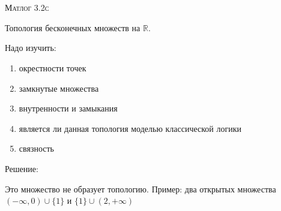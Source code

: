 \documentclass[10pt]{article}
\begin{document}
\def\chap#1#2{\ \\ {\large\bf#1 \ | \ \tt\scshape#2} \par}

\ \vspace{-1cm}

{\bf
\ \\
\Large\centerline{\scshape Матлог 3.2с}
}\normalsize

\vspace*{1cm}
Топология бесконечных множеств на $\mathbb{R}$.

Надо изучить: 
\begin{enumerate}
    \item окрестности точек
    \item замкнутые множества
    \item внутренности и замыкания
    \item является ли данная топология моделью классической логики
    \item связность
\end{enumerate}

Решение: 

Это множество не образует топологию. 
Пример: два открытых множества $(-\infty, 0) \cup \{1\}$ и $\{1\} \cup (2, +\infty)$
\end{document}

